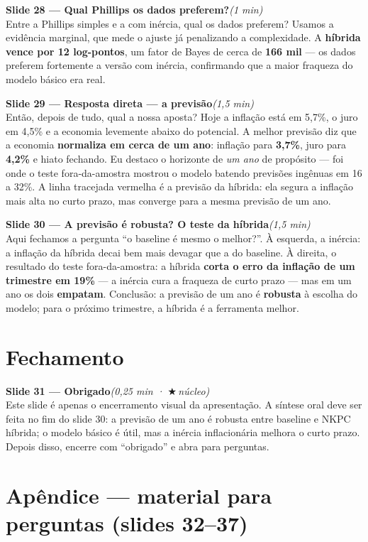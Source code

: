 \documentclass[11pt,a4paper]{article}
\newcommand{\slide}[3]{\medskip\noindent{\color{azul}\rule{3pt}{14pt}}\;
  \textbf{Slide #1 --- #2}\hfill\textit{(#3)}\\[1mm]}
\newcommand{\nucleo}{{\color{verdee}\footnotesize$\bigstar$\,núcleo}}
\begin{document}
\slide{28}{Qual Phillips os dados preferem?}{1 min}
Entre a Phillips simples e a com inércia, qual os dados preferem? Usamos a evidência marginal, que
mede o ajuste já penalizando a complexidade. A \textbf{híbrida vence por 12 log-pontos}, um fator de
Bayes de cerca de \textbf{166 mil} --- os dados preferem fortemente a versão com inércia, confirmando
que a maior fraqueza do modelo básico era real.

\slide{29}{Resposta direta --- a previsão}{1,5 min}
Então, depois de tudo, qual a nossa aposta? Hoje a inflação está em 5,7\%, o juro em 4,5\% e a economia
levemente abaixo do potencial. A melhor previsão diz que a economia \textbf{normaliza em cerca de um
ano}: inflação para \textbf{3,7\%}, juro para \textbf{4,2\%} e hiato fechando. Eu destaco o horizonte
de \emph{um ano} de propósito --- foi onde o teste fora-da-amostra mostrou o modelo batendo previsões
ingênuas em 16 a 32\%. A linha tracejada vermelha é a previsão da híbrida: ela segura a inflação mais
alta no curto prazo, mas converge para a mesma previsão de um ano.

\slide{30}{A previsão é robusta? O teste da híbrida}{1,5 min}
Aqui fechamos a pergunta ``o baseline é mesmo o melhor?''. À esquerda, a inércia: a inflação da híbrida
decai bem mais devagar que a do baseline. À direita, o resultado do teste fora-da-amostra: a híbrida
\textbf{corta o erro da inflação de um trimestre em 19\%} --- a inércia cura a fraqueza de curto prazo
--- mas em um ano os dois \textbf{empatam}. Conclusão: a previsão de um ano é \textbf{robusta} à escolha
do modelo; para o próximo trimestre, a híbrida é a ferramenta melhor.

\section{Fechamento}

\slide{31}{Obrigado}{0,25 min · \nucleo}
Este slide é apenas o encerramento visual da apresentação. A síntese oral deve ser feita no fim do
slide 30: a previsão de um ano é robusta entre baseline e NKPC híbrida; o modelo básico é útil, mas a
inércia inflacionária melhora o curto prazo. Depois disso, encerre com ``obrigado'' e abra para
perguntas.

\section{Apêndice --- material para perguntas (slides 32--37)}
\end{document}
